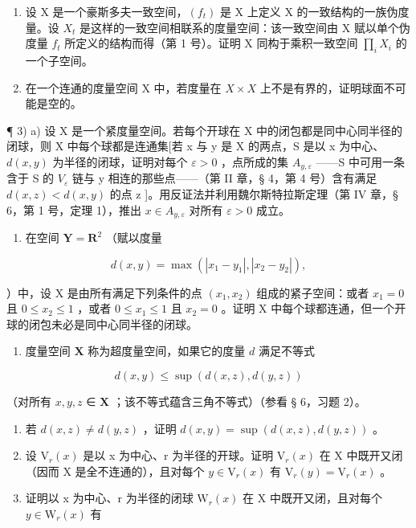 \begin{enumerate}
\def\labelenumi{\arabic{enumi})}
\item
  设 X 是一个豪斯多夫一致空间，\((f_{t})\) 是 X 上定义 X 的一致结构的一族伪度量。设 \(X_{t}\) 是这样的一致空间相联系的度量空间：该一致空间由 X 赋以单个伪度量 \(f_{t}\) 所定义的结构而得（第 1 号）。证明 X 同构于乘积一致空间 \(\prod_{i} X_{i}\) 的一个子空间。
\item
  在一个连通的度量空间 X 中，若度量在 \(X \times X\) 上不是有界的，证明球面不可能是空的。
\end{enumerate}

¶ 3) a) 设 X 是一个紧度量空间。若每个开球在 X 中的闭包都是同中心同半径的闭球，则 X 中每个球都是连通集{[}若 x 与 y 是 X 的两点，S 是以 x 为中心、\(d(x, y)\) 为半径的闭球，证明对每个 \(\varepsilon > 0\) ，点所成的集 \(A_{y,\varepsilon}\) ——S 中可用一条含于 S 的 \(V_{\varepsilon}\) 链与 y 相连的那些点——（第 II 章，§ 4，第 4 号）含有满足 \(d(x, z) < d(x, y)\) 的点 z {]}。用反证法并利用魏尔斯特拉斯定理（第 IV 章，§ 6，第 1 号，定理 1），推出 \(x \in A_{y,\varepsilon}\) 对所有 \(\varepsilon > 0\) 成立。

\begin{enumerate}
\def\labelenumi{\alph{enumi})}
\setcounter{enumi}{1}
\tightlist
\item
  在空间 \(\mathbf{Y} = \mathbf{R}^2\) （赋以度量
\end{enumerate}

\[
d (x, y) = \max \left(\left| x _ {1} - y _ {1} \right|, \left| x _ {2} - y _ {2} \right|\right),
\]

）中，设 X 是由所有满足下列条件的点 \((x_{1}, x_{2})\) 组成的紧子空间：或者 \(x_{1} = 0\) 且 \(0 \leqslant x_{2} \leqslant 1\) ，或者 \(0 \leqslant x_{1} \leqslant 1\) 且 \(x_{2} = 0\) 。证明 X 中每个球都连通，但一个开球的闭包未必是同中心同半径的闭球。

\begin{enumerate}
\def\labelenumi{\arabic{enumi})}
\setcounter{enumi}{3}
\tightlist
\item
  度量空间 \(\mathbf{X}\) 称为超度量空间，如果它的度量 \(d\) 满足不等式
\end{enumerate}

\[
d (x, y) \leqslant \sup \left(d (x, z), d (y, z)\right)
\]

（对所有 \(x, y, z\) ∈ \(\mathbf{X}\) ；该不等式蕴含三角不等式）（参看 § 6，习题 2）。

\begin{enumerate}
\def\labelenumi{\alph{enumi})}
\item
  若 \(d(x, z) \neq d(y, z)\) ，证明 \(d(x, y) = \sup (d(x, z), d(y, z))\) 。
\item
  设 \(\mathrm{V}_{r}(x)\) 是以 x 为中心、r 为半径的开球。证明 \(\mathrm{V}_{r}(x)\) 在 X 中既开又闭（因而 X 是全不连通的），且对每个 \(y \in \mathrm{V}_{r}(x)\) 有 \(\mathrm{V}_{r}(y) = \mathrm{V}_{r}(x)\) 。
\item
  证明以 x 为中心、r 为半径的闭球 \(\mathrm{W}_{r}(x)\) 在 X 中既开又闭，且对每个 \(y \in \mathrm{W}_{r}(x)\) 有
\end{enumerate}

